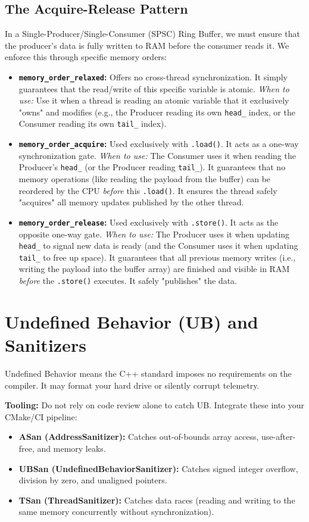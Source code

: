 \documentclass{article}
\begin{document}
\subsection{The Acquire-Release Pattern}
In a Single-Producer/Single-Consumer (SPSC) Ring Buffer, we must ensure that the producer's data is fully written to RAM before the consumer reads it. We enforce this through specific memory orders:
\begin{itemize}
    \item \textbf{\texttt{memory\_order\_relaxed}:} Offers no cross-thread synchronization. It simply guarantees that the read/write of this specific variable is atomic. \textit{When to use:} Use it when a thread is reading an atomic variable that it exclusively "owns" and modifies (e.g., the Producer reading its own \texttt{head\_} index, or the Consumer reading its own \texttt{tail\_} index).
    \item \textbf{\texttt{memory\_order\_acquire}:} Used exclusively with \texttt{.load()}. It acts as a one-way synchronization gate. \textit{When to use:} The Consumer uses it when reading the Producer's \texttt{head\_} (or the Producer reading \texttt{tail\_}). It guarantees that no memory operations (like reading the payload from the buffer) can be reordered by the CPU \textit{before} this \texttt{.load()}. It ensures the thread safely "acquires" all memory updates published by the other thread.
    \item \textbf{\texttt{memory\_order\_release}:} Used exclusively with \texttt{.store()}. It acts as the opposite one-way gate. \textit{When to use:} The Producer uses it when updating \texttt{head\_} to signal new data is ready (and the Consumer uses it when updating \texttt{tail\_} to free up space). It guarantees that all previous memory writes (i.e., writing the payload into the buffer array) are finished and visible in RAM \textit{before} the \texttt{.store()} executes. It safely "publishes" the data.
\end{itemize}

\section{Undefined Behavior (UB) and Sanitizers}
Undefined Behavior means the C++ standard imposes no requirements on the compiler. It may format your hard drive or silently corrupt telemetry. 

\textbf{Tooling:} Do not rely on code review alone to catch UB. Integrate these into your CMake/CI pipeline:
\begin{itemize}
    \item \textbf{ASan (AddressSanitizer):} Catches out-of-bounds array access, use-after-free, and memory leaks.
    \item \textbf{UBSan (UndefinedBehaviorSanitizer):} Catches signed integer overflow, division by zero, and unaligned pointers.
    \item \textbf{TSan (ThreadSanitizer):} Catches data races (reading and writing to the same memory concurrently without synchronization).
\end{itemize}
\end{document}
